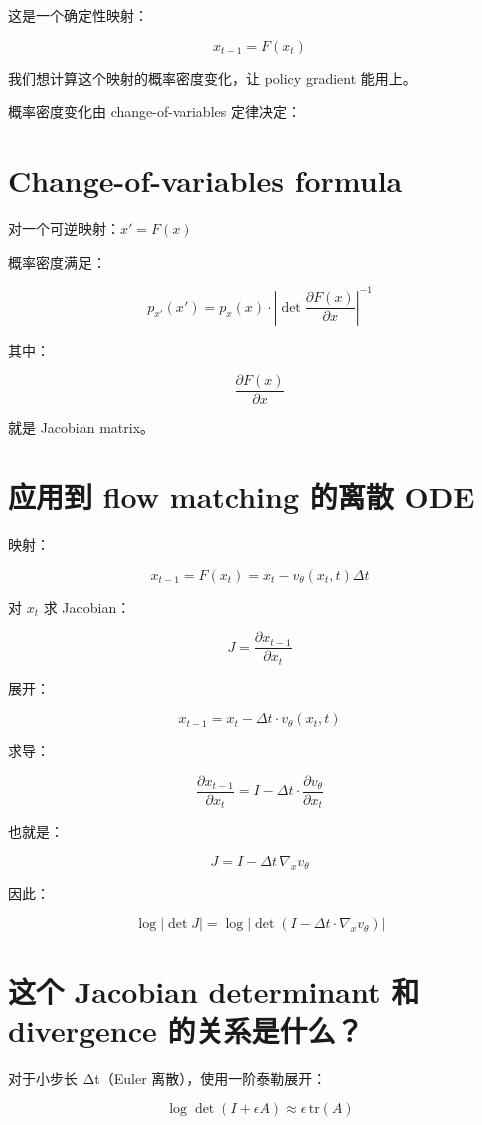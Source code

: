 这是一个确定性映射：

\[
x_{t-1} = F(x_t)
\]

我们想计算这个映射的概率密度变化，让 policy gradient 能用上。

概率密度变化由 change-of-variables 定律决定：

\section{Change-of-variables formula}

对一个可逆映射：\(x' = F(x)\)

概率密度满足：

\[
p_{x'}(x') = p_x(x)\cdot \left|\det \frac{\partial F(x)}{\partial x}\right|^{-1}
\]

其中：

\[
\frac{\partial F(x)}{\partial x}
\]

就是 Jacobian matrix。

\section{应用到 flow matching 的离散 ODE}

映射：

\[
x_{t-1} = F(x_t) = x_t - v_\theta(x_t,t)\Delta t
\]

对 \(x_t\) 求 Jacobian：

\[
J = \frac{\partial x_{t-1}}{\partial x_t}
\]

展开：

\[
x_{t-1} = x_t - \Delta t\cdot v_\theta(x_t,t)
\]

求导：

\[
\frac{\partial x_{t-1}}{\partial x_t} = I - \Delta t \cdot \frac{\partial v_\theta}{\partial x_t}
\]

也就是：

\[
J = I - \Delta t\,\nabla_x v_\theta
\]

因此：

\[
\log \left|\det J\right| = \log \left|\det\left(I - \Delta t \cdot \nabla_x v_\theta\right)\right|
\]

\section{这个 Jacobian determinant 和 divergence 的关系是什么？}

对于小步长 Δt（Euler 离散），使用一阶泰勒展开：

\[
\log \det(I + \epsilon A) \approx \epsilon \, \text{tr}(A)
\]

